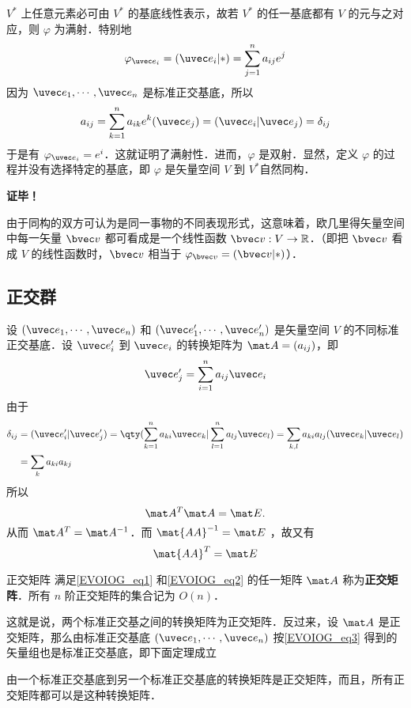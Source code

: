 $V^*$ 上任意元素必可由 $V^*$ 的基底线性表示，故若 $V^*$ 的任一基底都有 $V$ 的元与之对应，则 $\varphi$ 为满射．特别地
\begin{equation}
\varphi_{\uvec e_i}=(\uvec e_i|*)=\sum_{j=1}^{n} a_{ij}e^j
\end{equation}
因为  $\uvec e_1,\cdots,\uvec e_n$ 是标准正交基底，所以
\begin{equation}
a_{ij}=\sum_{k=1}^n a_{ik}e^k(\uvec e_j)=(\uvec e_i|\uvec e_j)=\delta_{ij}
\end{equation}
于是有 $\varphi_{\uvec e_i}=e^i$．这就证明了满射性．进而，$\varphi$ 是双射．显然，定义 $\varphi$ 的过程并没有选择特定的基底，即 $\varphi$ 是矢量空间 $V$ 到 $V^*$自然同构．

\textbf{证毕！}

由于同构的双方可认为是同一事物的不同表现形式，这意味着，欧几里得矢量空间中每一矢量 $\bvec v$ 都可看成是一个线性函数 $\bvec v:V\rightarrow\mathbb{R}$．（即把 $\bvec v$ 看成 $V$ 的线性函数时，$\bvec v$ 相当于 $\varphi_{\bvec v}=(\bvec v|*)$）．
\subsection{正交群}\label{EVOIOG_sub1}
设 $(\uvec e_1,\cdots,\uvec e_n)$ 和 $(\uvec e'_1,\cdots,\uvec e'_n)$ 是矢量空间 $V$ 的不同标准正交基底．设 $\uvec e'_i$ 到 $\uvec e_i$ 的转换矩阵为 $\mat A=(a_{ij})$，即
\begin{equation}\label{EVOIOG_eq3}
\uvec e'_j=\sum_{i=1}^n a_{ij}\uvec e_i
\end{equation}
由于
\begin{equation}
\begin{aligned}
\delta_{ij}&=(\uvec e'_i|\uvec e'_j)=\qty(\sum_{k=1}^n a_{ki}\uvec e_k|\sum_{l=1}^n a_{lj}\uvec e_l)=\sum_{k,l}a_{ki}a_{lj}(\uvec e_k|\uvec e_l)\\
&=\sum_{k}a_{ki}a_{kj}
\end{aligned}
\end{equation}
所以 
\begin{equation}\label{EVOIOG_eq1}
\mat A^T \mat A=\mat E.
\end{equation}
从而 $\mat A^T=\mat A^{-1}$．而 $\mat{AA}^{-1}=\mat E$ ，故又有
\begin{equation}\label{EVOIOG_eq2}
\mat{AA}^T=\mat E
\end{equation}
\begin{definition}{正交矩阵}
满足\autoref{EVOIOG_eq1} 和\autoref{EVOIOG_eq2} 的任一矩阵 $\mat A$ 称为\textbf{正交矩阵}．所有 $n$ 阶正交矩阵的集合记为 $O(n)$．
\end{definition}
这就是说，两个标准正交基之间的转换矩阵为正交矩阵．反过来，设 $\mat A$ 是正交矩阵，那么由标准正交基底 $(\uvec e_1,\cdots,\uvec e_n)$ 按\autoref{EVOIOG_eq3} 得到的矢量组也是标准正交基底，即下面定理成立
\begin{theorem}{}
由一个标准正交基底到另一个标准正交基底的转换矩阵是正交矩阵，而且，所有正交矩阵都可以是这种转换矩阵．
\end{theorem}

